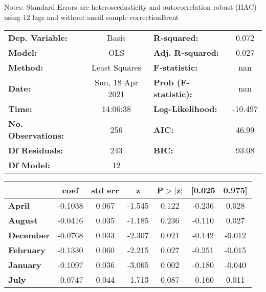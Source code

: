 Notes: \newline
 [1] Standard Errors are heteroscedasticity and autocorrelation robust (HAC) using 12 lags and without small sample correctionBrent\begin{center}
\begin{tabular}{lclc}
\toprule
\textbf{Dep. Variable:}    &      Basis       & \textbf{  R-squared:         } &     0.072   \\
\textbf{Model:}            &       OLS        & \textbf{  Adj. R-squared:    } &     0.027   \\
\textbf{Method:}           &  Least Squares   & \textbf{  F-statistic:       } &       nan   \\
\textbf{Date:}             & Sun, 18 Apr 2021 & \textbf{  Prob (F-statistic):} &      nan    \\
\textbf{Time:}             &     14:06:38     & \textbf{  Log-Likelihood:    } &   -10.497   \\
\textbf{No. Observations:} &         256      & \textbf{  AIC:               } &     46.99   \\
\textbf{Df Residuals:}     &         243      & \textbf{  BIC:               } &     93.08   \\
\textbf{Df Model:}         &          12      & \textbf{                     } &             \\
\bottomrule
\end{tabular}
\begin{tabular}{lcccccc}
                   & \textbf{coef} & \textbf{std err} & \textbf{z} & \textbf{P$> |$z$|$} & \textbf{[0.025} & \textbf{0.975]}  \\
\midrule
\textbf{April}     &      -0.1038  &        0.067     &    -1.545  &         0.122        &       -0.236    &        0.028     \\
\textbf{August}    &      -0.0416  &        0.035     &    -1.185  &         0.236        &       -0.110    &        0.027     \\
\textbf{December}  &      -0.0768  &        0.033     &    -2.307  &         0.021        &       -0.142    &       -0.012     \\
\textbf{February}  &      -0.1330  &        0.060     &    -2.215  &         0.027        &       -0.251    &       -0.015     \\
\textbf{January}   &      -0.1097  &        0.036     &    -3.065  &         0.002        &       -0.180    &       -0.040     \\
\textbf{July}      &      -0.0747  &        0.044     &    -1.713  &         0.087        &       -0.160    &        0.011     \\

\end{tabular}
\end{center}
